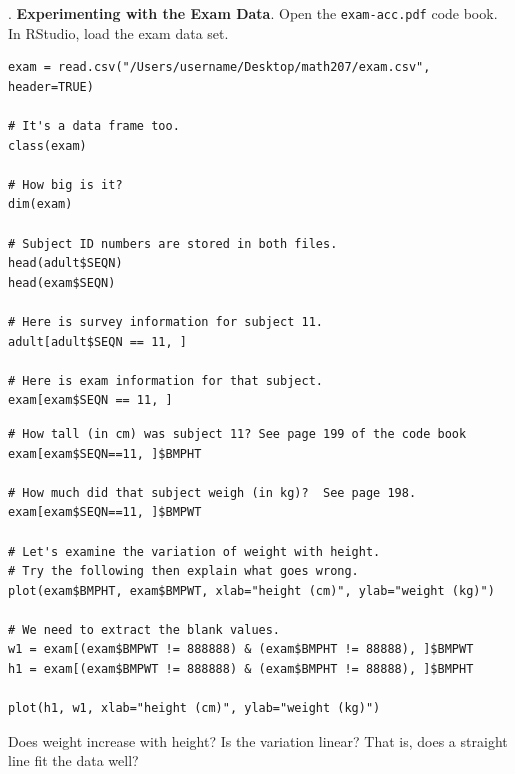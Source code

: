\documentclass[10pt]{article}
\newcounter{EX}\setcounter{EX}{1}
\newcommand{\EXERCISE}{\arabic{EX}.\stepcounter{EX} }
\begin{document}
\EXERCISE \textbf{Experimenting with the Exam Data}.  Open the \texttt{exam-acc.pdf}
code book.  In RStudio, load the exam data set.\vspace{-6pt}
\begin{verbatim}
exam = read.csv("/Users/username/Desktop/math207/exam.csv", header=TRUE)

# It's a data frame too.
class(exam) 

# How big is it?
dim(exam)

# Subject ID numbers are stored in both files.
head(adult$SEQN)
head(exam$SEQN)

# Here is survey information for subject 11.
adult[adult$SEQN == 11, ]

# Here is exam information for that subject.
exam[exam$SEQN == 11, ]

\end{verbatim}


\begin{verbatim}
# How tall (in cm) was subject 11? See page 199 of the code book
exam[exam$SEQN==11, ]$BMPHT

# How much did that subject weigh (in kg)?  See page 198.
exam[exam$SEQN==11, ]$BMPWT

# Let's examine the variation of weight with height.  
# Try the following then explain what goes wrong.
plot(exam$BMPHT, exam$BMPWT, xlab="height (cm)", ylab="weight (kg)")

# We need to extract the blank values.
w1 = exam[(exam$BMPWT != 888888) & (exam$BMPHT != 88888), ]$BMPWT
h1 = exam[(exam$BMPWT != 888888) & (exam$BMPHT != 88888), ]$BMPHT

plot(h1, w1, xlab="height (cm)", ylab="weight (kg)")
\end{verbatim}

Does weight increase with height?  Is the variation linear?  That is, does a straight
line fit the data  well?
\bigskip\bigskip\bigskip

\vfill
\eject
\end{document}
